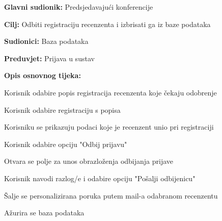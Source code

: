 					\noindent {}
					\begin{packed_item}
	
						\item \textbf{Glavni sudionik: } Predsjedavajući konferencije
						\item  \textbf{Cilj:} Odbiti registraciju recenzenta i izbrisati ga iz baze podataka
						\item  \textbf{Sudionici:} Baza podataka
						\item  \textbf{Preduvjet:} Prijava u sustav
						\item  \textbf{Opis osnovnog tijeka:}
						
						\item[] \begin{packed_enum}
	
							\item Korisnik odabire popis registracija recenzenta koje čekaju odobrenje
							\item Korisnik odabire registraciju s popisa
							\item Korisniku se prikazuju podaci koje je recenzent unio pri registraciji
							\item Korisnik odabire opciju "Odbij prijavu"
							\item Otvara se polje za unos obrazloženja odbijanja prijave
							\item Korisnik navodi razlog/e i odabire opciju "Pošalji odbijenicu"
							\item Šalje se personalizirana poruka putem mail-a odabranom recenzentu
							\item Ažurira se baza podataka

					
						\end{packed_enum}
			
					\end{packed_item}

